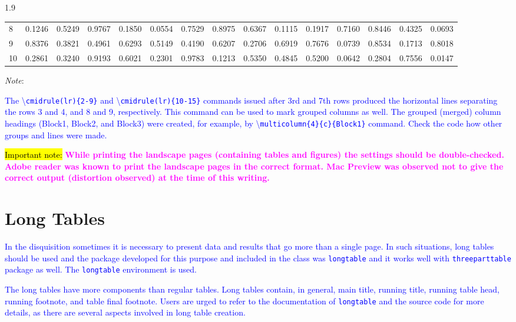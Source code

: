 \documentclass[phd]{ndsu-thesis-2022}
\newcommand\myspacing{1.9}      %
\newcommand\italk[1]{\textcolor{blue}{#1}}  %
\newcommand\cmd[1]{\textbackslash\texttt{#1}}  %
\newcommand\vb[1]{\textcolor{blue}{\texttt{#1}}}%
\begin{document}
\begin{spacing}{\myspacing}
\begin{landscape}
\begin{table}[p]
{\begin{tabular}{l  rrrr  cccc  llll  rr}
8 & 0.1246 & 0.5249 & 0.9767 & 0.1850 & 0.0554 & 0.7529 & 0.8975 & 0.6367 & 0.1115 & 0.1917 & 0.7160 & 0.8446 & 0.4325 & 0.0693 \\
\cmidrule(lr){10-15}
9 & 0.8376 & 0.3821 & 0.4961 & 0.6293 & 0.5149 & 0.4190 & 0.6207 & 0.2706 & 0.6919 & 0.7676 & 0.0739 & 0.8534 & 0.1713 & 0.8018 \\
10 & 0.2861 & 0.3240 & 0.9193 & 0.6021 & 0.2301 & 0.9783 & 0.1213 & 0.5350 & 0.4845 & 0.5200 & 0.0642 & 0.2804 & 0.7556 & 0.0147 \\
\bottomrule
\end{tabular}
}    
\begin{tablenotes}[flushleft]
\footnotesize
\item \hspace{-1ex} \emph{Note}: \italk{The \cmd{cmidrule(lr)\{2-9\}} and \cmd{cmidrule(lr)\{10-15\}} commands issued after 3rd and 7th rows produced the horizontal lines separating the rows 3 and 4, and 8 and 9, respectively. This command can be used to mark grouped columns as well. The grouped (merged) column headings (Block1, Block2, and Block3) were created, for example, by \cmd{multicolumn\{4\}\{c\}\{Block1\}} command. Check the code how other groups and lines were made.
\item \vspace{4ex}
\italk{\hl{Important note:}} \textcolor{magenta}{\bfseries While printing the landscape pages (containing tables and figures) the settings should be double-checked. Adobe reader was known to print the landscape pages in the correct format. Mac Preview was observed not to give the correct output (distortion observed) at the time of this writing.}
}  
\end{tablenotes}  
\label{tab210}
\end{table}
\end{landscape}

\section{Long Tables}
\italk{In the disquisition sometimes it is necessary to present data and results that go more than a single page. In such situations, long tables should be used and the package developed for this purpose and included in the class was 
\vb{longtable} and it works well with \vb{threeparttable} package as well. The \vb{longtable} environment is used.} 

\italk{The long tables have more components than regular tables. Long tables contain, in general, main title, running title, running table head, running footnote, and table final footnote. Users are urged to refer to the documentation of \vb{longtable} and the source code for more details, as there are several aspects involved in long table creation.}


\end{spacing}
\end{document}
